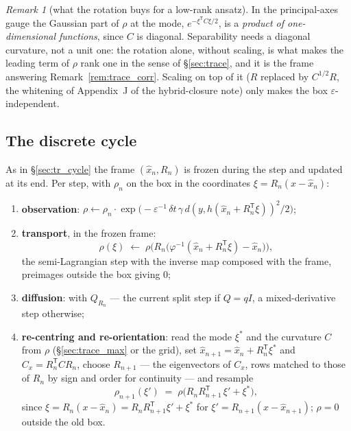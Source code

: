 \documentclass[11pt,a4paper]{article}
\newcommand{\T}{^{\mathsf T}}
\newcommand{\xh}{\hat{x}}
\newcommand{\eps}{\varepsilon}
\newcommand{\dt}{\,\delta t}
\theoremstyle{plain}
\theoremstyle{definition}
\theoremstyle{remark}
\newtheorem{remark}{Remark}
\begin{document}
\begin{remark}[what the rotation buys for a low-rank ansatz]
In the principal-axes gauge the Gaussian part of $\rho$ at the mode, $e^{-\xi\T C\xi/2}$, is a \emph{product of one-dimensional functions}, since $C$ is diagonal. Separability needs a diagonal curvature, not a unit one: the rotation alone, without scaling, is what makes the leading term of $\rho$ rank one in the sense of \S\ref{sec:trace}, and it is the frame answering Remark~\ref{rem:trace_corr}. Scaling on top of it ($R$ replaced by $C^{1/2}R$, the whitening of Appendix~J of the hybrid-closure note) only makes the box $\eps$-independent.
\end{remark}

\subsection{The discrete cycle}
\label{sec:rot_cycle}

As in \S\ref{sec:tr_cycle} the frame $(\xh_n,R_n)$ is frozen during the step and updated at its end. Per step, with $\rho_n$ on the box in the coordinates $\xi=R_n(x-\xh_n)$:
\begin{enumerate}[leftmargin=1.5em,nosep]
  \item \textbf{observation}: $\rho\leftarrow\rho_n\cdot\exp\big(-\eps^{-1}\dt\,\gamma\,d(y,h(\xh_n+R_n\T\xi))^2/2\big)$;
  \item \textbf{transport}, in the frozen frame:
  \begin{equation}
    \rho(\xi)\;\leftarrow\;\rho\Big(R_n\big(\varphi^{-1}(\xh_n+R_n\T\xi)-\xh_n\big)\Big),
    \label{eq:rot_transport}
  \end{equation}
  the semi-Lagrangian step with the inverse map composed with the frame, preimages outside the box giving $0$;
  \item \textbf{diffusion}: with $Q_{R_n}$ --- the current split step if $Q=qI$, a mixed-derivative step otherwise;
  \item \textbf{re-centring and re-orientation}: read the mode $\xi^*$ and the curvature $C$ from $\rho$ (\S\ref{sec:trace_max} or the grid), set $\xh_{n+1}=\xh_n+R_n\T\xi^*$ and $C_x=R_n\T CR_n$, choose $R_{n+1}$ --- the eigenvectors of $C_x$, rows matched to those of $R_n$ by sign and order for continuity --- and resample
  \begin{equation}
    \rho_{n+1}(\xi') \;=\; \rho\big(R_nR_{n+1}\T\,\xi' + \xi^*\big),
    \label{eq:rot_resample}
  \end{equation}
  since $\xi = R_n(x-\xh_n) = R_nR_{n+1}\T\xi' + \xi^*$ for $\xi'=R_{n+1}(x-\xh_{n+1})$; $\rho=0$ outside the old box.
\end{enumerate}
\end{document}
